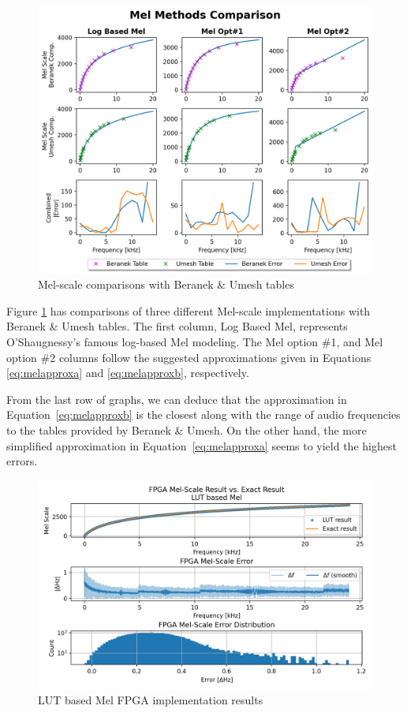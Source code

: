 \begin{figure}[H]
    \centering
    \includegraphics[width=\linewidth]{Scaling/images/mel_methods_comp}
    \caption{Mel-scale comparisons with Beranek \& Umesh tables}\label{fig:mel_methods_comp}
\end{figure}

Figure \ref{fig:mel_methods_comp} has comparisons of three different 
Mel-scale implementations with Beranek \& Umesh tables.
The first column, Log Based Mel, represents
O'Shaugnessy's famous log-based Mel modeling.
The Mel option \#1, and Mel option \#2 columns 
follow the suggested approximations
given in Equations \ref{eq:melapproxa} 
and \ref{eq:melapproxb}, respectively.

From the last row of graphs, we can deduce that the approximation
in Equation~\ref{eq:melapproxb} 
is the closest along with the range of audio frequencies
to the tables provided by Beranek \& Umesh.
On the other hand, the more simplified approximation 
in Equation~\ref{eq:melapproxa} seems 
to yield the highest errors.

\begin{figure}[H]
    \centering
    \includegraphics[width=\linewidth]{Scaling/images/mel_lut}
    \caption{LUT based Mel FPGA implementation results}\label{fig:mel_lut}
\end{figure}

